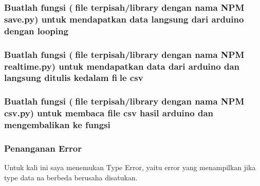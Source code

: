 \subsubsection{Buatlah fungsi (file terpisah/library dengan nama NPM save.py) untuk mendapatkan data langsung dari arduino dengan looping}


\subsubsection{Buatlah fungsi (file terpisah/library dengan nama NPM realtime.py) untuk mendapatkan data dari arduino dan langsung ditulis kedalam file csv}


\subsubsection{Buatlah fungsi (file terpisah/library dengan nama NPM csv.py) untuk membaca file csv hasil arduino dan mengembalikan ke fungsi}


\subsubsection{Penanganan Error}
Untuk kali ini saya menemukan Type Error, yaitu error yang menampilkan jika type data na berbeda berusaha disatukan.

